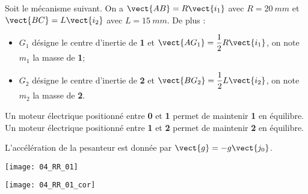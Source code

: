 \normaltrue
\correctiontrue


\setcounter{question}{0}%
\ifcorrection
\else
{}
\fi

\ifprof
\else
Soit le mécanisme suivant. On a $\vect{AB}=R\vect{i_1}$ avec $R=\SI{20}{mm}$ et  
$\vect{BC}=L\vect{i_2}$ avec $L=\SI{15}{mm}$. De plus :
\begin{itemize}
\item $G_1$ désigne le centre d'inertie de \textbf{1} et $\vect{AG_1}=\dfrac{1}{2}R\vect{i_1}$, on note $m_1$ la masse de \textbf{1}; %
\item $G_2$ désigne le centre d'inertie de \textbf{2} et $\vect{BG_2}=\dfrac{1}{2}L\vect{i_2}$, on note $m_2$ la masse de \textbf{2}.%
\end{itemize}

Un moteur électrique positionné entre \textbf{0} et \textbf{1} permet de maintenir \textbf{1} en équilibre.
Un moteur électrique positionné entre \textbf{1} et \textbf{2} permet de maintenir \textbf{2} en équilibre.

L'accélération de la pesanteur est donnée par $\vect{g}=-g\vect{j_0}$.

\begin{marginfigure}
\texttt{[image: 04\_RR\_01]}
\end{marginfigure}
\fi

\ifprof
\begin{marginfigure}
\texttt{[image: 04\_RR\_01\_cor]}
\end{marginfigure}
\else
\fi

